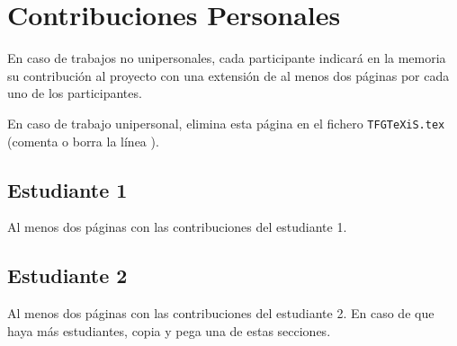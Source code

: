 \chapter*{Contribuciones Personales}
\label{cap:contribucionesPersonales}

En caso de trabajos no unipersonales, cada participante indicará en la memoria su contribución al proyecto con una extensión de al menos dos páginas por cada uno de los participantes.

En caso de trabajo unipersonal, elimina esta página en el fichero \texttt{TFGTeXiS.tex} (comenta o borra la línea \verb||).

\section*{Estudiante 1}
Al menos dos páginas con las contribuciones del estudiante 1.

\section*{Estudiante 2}
Al menos dos páginas con las contribuciones del estudiante 2. En caso de que haya más estudiantes, copia y pega una de estas secciones.

